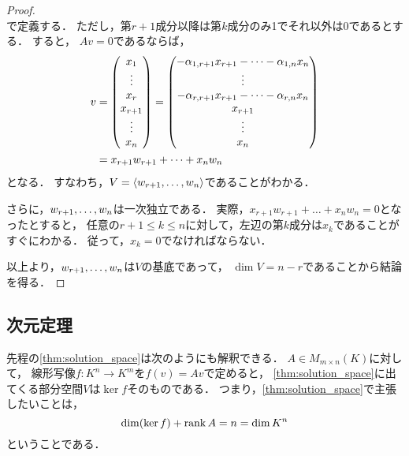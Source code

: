\begin{proof}
\[  \]
  で定義する．
  ただし，第$r+1$成分以降は第$k$成分のみ1でそれ以外は0であるとする．
  すると，
  $Av = 0$であるならば，
  \[
    \begin{split}
      v &= \begin{pmatrix} x_1 \\ \vdots \\ x_r \\ x_{r+1} \\ \vdots \\ x_n \end{pmatrix}
        = \begin{pmatrix} -\alpha_{1,r+1} x_{r+1} - \dots - \alpha_{1,n}x_n \\ 
              \vdots \\ 
              -\alpha_{r,r+1} x_{r+1} - \dots - \alpha_{r,n}x_n \\
              x_{r+1} \\ \vdots \\ x_n  \end{pmatrix} \\
        &= x_{r+1} w_{r+1} + \dots + x_n w_n
    \end{split}
  \]
  となる．
  すなわち，$V = \left\langle w_{r+1},\dots,w_{n} \right\rangle$であることがわかる．

  さらに，$w_{r+1},\dots,w_{n}$は一次独立である．
  実際，$x_{r+1} w_{r+1} + \dots + x_n w_n = 0$となったとすると，
  任意の$r+1 \le k \le n$に対して，左辺の第$k$成分は$x_k$であることがすぐにわかる．
  従って，$x_k = 0$でなければならない．

  以上より，$w_{r+1},\dots,w_{n}$は$V$の基底であって，
  $\dim V = n - r$であることから結論を得る．
  \end{proof}
  \subsection{次元定理}
先程の\cref{thm:solution_space}は次のようにも解釈できる．
\(A \in M_{m \times n}(K)\)に対して，
線形写像$f \colon K^n \to K^m$を$f(v)=Av$で定めると，
\cref{thm:solution_space}に出てくる部分空間$V$は$\ker f$そのものである．
つまり，\cref{thm:solution_space}で主張したいことは，
\[
  \dim (\ker f) + \mathrm{rank}\, A = n = \dim K^n
\]
ということである．

